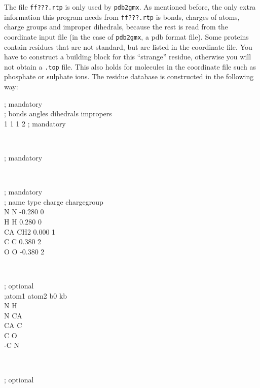 The file {\tt ff???.rtp} is only used by {\tt pdb2gmx}.
As mentioned before, the only extra information this
program needs from {\tt ff???.rtp} is bonds, charges of atoms,
charge groups and improper dihedrals, because the rest is read from
the coordinate input file (in the case of {\tt pdb2gmx}, a pdb format
file). Some proteins contain residues that are not standard, but are
listed in the coordinate file. You have to construct a building block
for this ``strange'' residue, otherwise you will not obtain a
{\tt *.top} file. This also holds for molecules in the
coordinate file such as phosphate or sulphate ions.
The residue database is constructed in the following way:\\
\begin{small}
\begin{tt}
[ bondedtypes ]  ; mandatory\\
; bonds  angles  dihedrals  impropers\\
     1       1          1          2  ; mandatory\\
\end{tt}\\
\begin{tt}
[ GLY ]  ; mandatory\\
\end{tt}\\
\begin{tt}
 [ atoms ]  ; mandatory \\
; name  type  charge  chargegroup \\
     N     N  -0.280     0\\
     H     H   0.280     0\\
    CA   CH2   0.000     1\\
     C     C   0.380     2\\
     O     O  -0.380     2\\
\end{tt}\\
\begin{tt}
 [ bonds ]  ; optional\\
;atom1 atom2      b0      kb\\
     N     H\\
     N    CA\\
    CA     C\\
     C     O\\
    -C     N\\
\end{tt}\\
\begin{tt}
 [ exclusions ]  ; optional\\

\end{tt}
\end{small}
